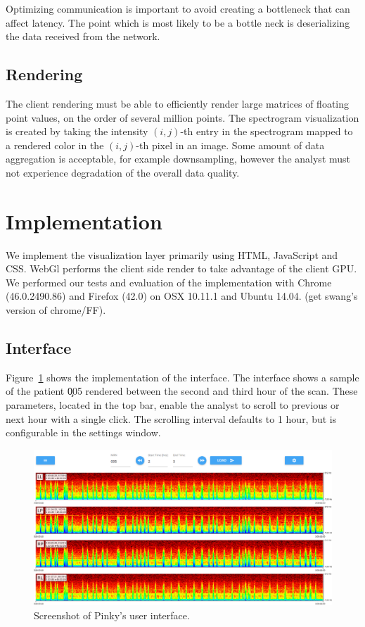 Optimizing communication is important to avoid creating a bottleneck that can
affect latency. The point which is most likely to be a bottle neck is
deserializing the data received from the network.

\subsection{Rendering}

The client rendering must be able to efficiently render large matrices of
floating point values, on the order of several million points.  The spectrogram
visualization is created by taking the intensity $(i, j)$-th entry in the
spectrogram mapped to a rendered color in the $(i, j)$-th pixel in an image.
Some amount of data aggregation is acceptable, for example downsampling,
however the  analyst must not experience degradation of the overall data
quality. \\

\section{Implementation}

We implement the visualization layer primarily using HTML, JavaScript and CSS.
WebGl performs the client side render to take advantage of the client GPU. We
performed our tests and evaluation of the implementation with Chrome
(46.0.2490.86) and Firefox (42.0) on OSX 10.11.1 and Ubuntu 14.04. (get swang's
version of chrome/FF).

\subsection{Interface}

Figure~\ref{fig:whole-interface} shows the implementation of the interface. The
interface shows a sample of the patient \c{005} rendered between the second and
third hour of the scan. These parameters, located in the top bar, enable the
analyst to scroll to previous or next hour with a single click. The scrolling
interval defaults to 1 hour, but is configurable in the settings window. \\

\begin{figure}[h]
\begin{center}
\includegraphics[scale=0.35]{./img/whole-interface.png}
\caption{Screenshot of Pinky's user interface.}
\label{fig:whole-interface}
\end{center}
\end{figure}

